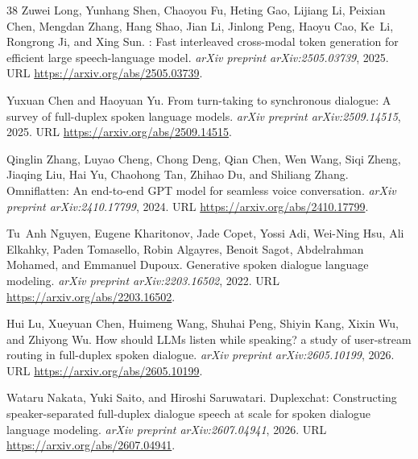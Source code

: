 \documentclass[UTF8,fontset=none,a4paper,10pt]{ctexart}
\begin{document}
{\begin{thebibliography}{38}
Zuwei Long, Yunhang Shen, Chaoyou Fu, Heting Gao, Lijiang Li, Peixian Chen,
  Mengdan Zhang, Hang Shao, Jian Li, Jinlong Peng, Haoyu Cao, Ke~Li, Rongrong
  Ji, and Xing Sun.
: Fast interleaved cross-modal token generation for
  efficient large speech-language model.
\newblock \emph{arXiv preprint arXiv:2505.03739}, 2025.
\newblock URL \url{https://arxiv.org/abs/2505.03739}.

Yuxuan Chen and Haoyuan Yu.
\newblock From turn-taking to synchronous dialogue: A survey of full-duplex
  spoken language models.
\newblock \emph{arXiv preprint arXiv:2509.14515}, 2025.
\newblock URL \url{https://arxiv.org/abs/2509.14515}.

Qinglin Zhang, Luyao Cheng, Chong Deng, Qian Chen, Wen Wang, Siqi Zheng,
  Jiaqing Liu, Hai Yu, Chaohong Tan, Zhihao Du, and Shiliang Zhang.
\newblock Omniflatten: An end-to-end {GPT} model for seamless voice
  conversation.
\newblock \emph{arXiv preprint arXiv:2410.17799}, 2024.
\newblock URL \url{https://arxiv.org/abs/2410.17799}.

Tu~Anh Nguyen, Eugene Kharitonov, Jade Copet, Yossi Adi, Wei-Ning Hsu, Ali
  Elkahky, Paden Tomasello, Robin Algayres, Benoit Sagot, Abdelrahman Mohamed,
  and Emmanuel Dupoux.
\newblock Generative spoken dialogue language modeling.
\newblock \emph{arXiv preprint arXiv:2203.16502}, 2022.
\newblock URL \url{https://arxiv.org/abs/2203.16502}.

Hui Lu, Xueyuan Chen, Huimeng Wang, Shuhai Peng, Shiyin Kang, Xixin Wu, and
  Zhiyong Wu.
\newblock How should {LLM}s listen while speaking? a study of user-stream
  routing in full-duplex spoken dialogue.
\newblock \emph{arXiv preprint arXiv:2605.10199}, 2026.
\newblock URL \url{https://arxiv.org/abs/2605.10199}.

Wataru Nakata, Yuki Saito, and Hiroshi Saruwatari.
\newblock Duplexchat: Constructing speaker-separated full-duplex dialogue
  speech at scale for spoken dialogue language modeling.
\newblock \emph{arXiv preprint arXiv:2607.04941}, 2026.
\newblock URL \url{https://arxiv.org/abs/2607.04941}.


\end{thebibliography}}
\end{document}
